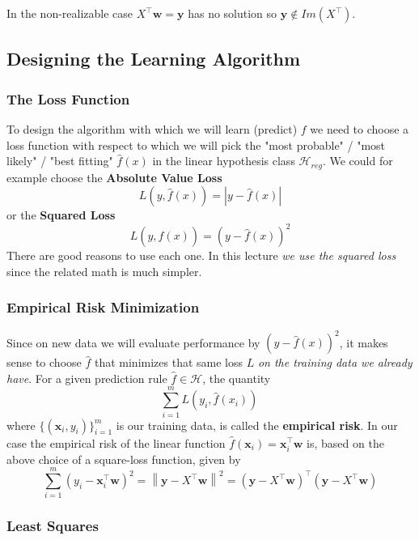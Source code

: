 \documentclass[11pt]{article}
\newcommand{\norm}[1]{\left\| #1\right\|}
\newcommand{\Tr}{\ensuremath{\top}}
\newcommand{\Hc}{\mathcal{H}}
\begin{document}
In the non-realizable case $X^\Tr \mathbf{w}=\mathbf{y}$ has no solution so $\mathbf{y}\notin Im(X^\Tr)$.





\subsection{Designing the Learning Algorithm}

\subsubsection{The Loss Function}

To design the algorithm with which we will learn (predict) $f$ we need to choose a loss function with respect to which we will pick the "most probable" / "most likely" / "best fitting" $\hat{f}(x)$ in the linear hypothesis class $\Hc_{reg}$. We could for example choose the \textbf{Absolute Value Loss}
     \[
      L(y,\hat{f}(x)) = |y - \hat{f}(x)|
     \]
     or the \textbf{Squared Loss}
     \[
      L(y,\hat{f}(x)) = (y - \hat{f}(x))^2
     \]
There are good reasons to use each one. In this lecture \textit{we use the squared loss} since the related math is much simpler.



\subsubsection{Empirical Risk Minimization}

Since on new data we will evaluate performance by $(y-\hat{f}(x))^2$, it makes sense to choose $\hat{f}$ that minimizes that same loss $L$ \textit{on the training data we already have}.
 For a given prediction rule $\hat{f}\in\Hc$, the quantity
  \[
   \sum_{i=1}^m L(y_i,\hat{f}(x_i))\,
   \]
where $\{(\mathbf{x}_i,y_i)\}_{i=1}^m$ is our training data, is called the \textbf{empirical risk}. In our case the empirical risk of the linear function
   $\hat{f}(\mathbf{x}_i)=\mathbf{x}_i^\Tr\mathbf{w}$ is,  based on the above choice of a square-loss function, given by
   \[
   \sum_{i=1}^m(y_i-\mathbf{x}_i^\Tr\mathbf{w})^2 = \norm{\mathbf{y}-X^\Tr\mathbf{w}}^2 =
   (\mathbf{y}-X^\Tr\mathbf{w})^\Tr(\mathbf{y}-X^\Tr\mathbf{w})
   \]

\subsubsection{Least Squares}
\end{document}
